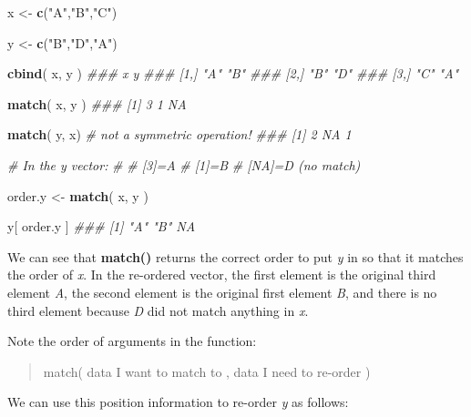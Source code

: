 \documentclass[]{book}
\newenvironment{Shaded}{\begin{snugshade}}{\end{snugshade}}
\newcommand{\CommentTok}[1]{\textcolor[rgb]{0.56,0.35,0.01}{\textit{#1}}}
\newcommand{\KeywordTok}[1]{\textcolor[rgb]{0.13,0.29,0.53}{\textbf{#1}}}
\newcommand{\NormalTok}[1]{#1}
\newcommand{\StringTok}[1]{\textcolor[rgb]{0.31,0.60,0.02}{#1}}
\theoremstyle{definition}
\theoremstyle{definition}
\theoremstyle{definition}
\theoremstyle{remark}
\begin{document}
\begin{Shaded}
\begin{Highlighting}[]

\NormalTok{x <-}\StringTok{ }\KeywordTok{c}\NormalTok{(}\StringTok{"A"}\NormalTok{,}\StringTok{"B"}\NormalTok{,}\StringTok{"C"}\NormalTok{)}

\NormalTok{y <-}\StringTok{ }\KeywordTok{c}\NormalTok{(}\StringTok{"B"}\NormalTok{,}\StringTok{"D"}\NormalTok{,}\StringTok{"A"}\NormalTok{)}

\KeywordTok{cbind}\NormalTok{( x, y )}
\CommentTok{###      x   y  }
\CommentTok{### [1,] "A" "B"}
\CommentTok{### [2,] "B" "D"}
\CommentTok{### [3,] "C" "A"}

\KeywordTok{match}\NormalTok{( x, y )}
\CommentTok{### [1]  3  1 NA}

\KeywordTok{match}\NormalTok{( y, x) }\CommentTok{# not a symmetric operation!}
\CommentTok{### [1]  2 NA  1}

\CommentTok{# In the y vector:}
\CommentTok{#}
\CommentTok{#  [3]=A}
\CommentTok{#  [1]=B}
\CommentTok{# [NA]=D (no match)}

\NormalTok{order.y <-}\StringTok{ }\KeywordTok{match}\NormalTok{( x, y )}

\NormalTok{y[ order.y ]}
\CommentTok{### [1] "A" "B" NA}
\end{Highlighting}
\end{Shaded}

We can see that \textbf{match()} returns the correct order to put
\emph{y} in so that it matches the order of \emph{x}. In the re-ordered
vector, the first element is the original third element \emph{A}, the
second element is the original first element \emph{B}, and there is no
third element because \emph{D} did not match anything in \emph{x}.

Note the order of arguments in the function:

\begin{quote}
match( data I want to match to , data I need to re-order )
\end{quote}

We can use this position information to re-order \emph{y} as follows:
\end{document}
